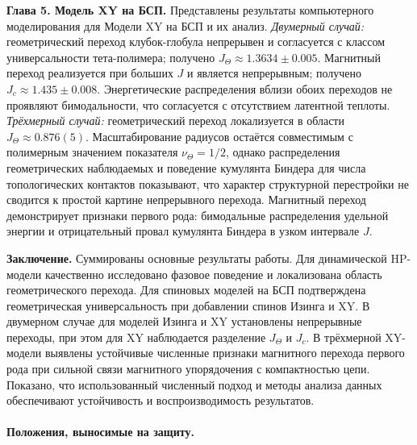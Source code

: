 \medskip
\noindent\textbf{Глава 5. Модель XY на БСП.}
Представлены результаты компьютерного моделирования для Модели XY на БСП и их анализ. 
\emph{Двумерный случай:} геометрический переход клубок-глобула непрерывен и согласуется с классом универсальности тета-полимера; получено $J_{\Theta}\approx 1.3634\pm 0.005$. Магнитный переход реализуется при больших $J$ и является непрерывным; получено $J_{c}\approx 1.435\pm 0.008$.
 Энергетические распределения вблизи обоих переходов  не проявляют бимодальности, что согласуется с отсутствием латентной теплоты.\\
\emph{Трёхмерный случай:} геометрический переход локализуется в области
$J_{\Theta}\approx 0.876(5)$. Масштабирование радиусов остаётся совместимым
с полимерным значением показателя $\nu_{\Theta}=1/2$, однако
распределения геометрических наблюдаемых и поведение кумулянта Биндера
для числа топологических контактов показывают, что характер структурной
перестройки не сводится к простой картине непрерывного перехода.
Магнитный переход демонстрирует признаки первого рода: бимодальные распределения удельной энергии и отрицательный провал кумулянта Биндера в узком интервале $J$.


\medskip
\noindent\textbf{Заключение.}
Суммированы основные результаты работы. 
Для динамической HP-модели качественно исследовано фазовое поведение и локализована область геометрического перехода. 
Для спиновых моделей на БСП подтверждена геометрическая универсальность при добавлении спинов Изинга и XY. 
В двумерном случае для моделей Изинга и XY установлены непрерывные переходы, при этом для XY наблюдается разделение $J_{\Theta}$ и $J_{c}$.
В трёхмерной XY-модели выявлены устойчивые численные признаки магнитного перехода первого рода при сильной связи магнитного упорядочения с компактностью цепи.
 Показано, что использованный численный подход и методы анализа данных обеспечивают устойчивость и воспроизводимость результатов.

 

\paragraph*{Положения, выносимые на защиту.}

